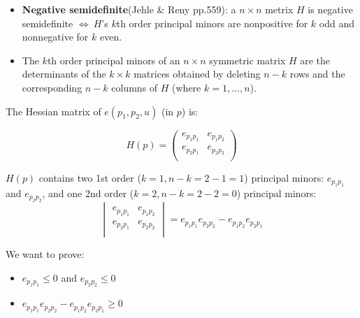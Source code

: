 \documentclass{article}
\begin{document}
\begin{mdframed}[backgroundcolor=blue!20,linecolor=white]
\begin{itemize}
\item \textbf{Negative semidefinite}(Jehle \& Reny pp.559): a $n \times n$ metrix $H$ is negative semidefinite $\iff \ H$'s $k$th order principal minors are nonpositive for $k$ odd and nonnegative for $k$ even.

\item The $k$th order principal minors of an $n \times n$ symmetric matrix $H$ are the determinants of the $k \times k$ matrices obtained by deleting $n − k$ rows and the corresponding $n − k$ columns of $H$ (where $k = 1, ..., n$).

\end{itemize}

\vspace{2mm}

The Hessian matrix of $e(p_1,p_2,u)$ (in $p$) is:

\vspace{2mm}


\begin{equation}
H(p)=\left(
    \begin{array}{cc}
		e_{p_1p_1} & e_{p_1p_2}  \\
		e_{p_2p_1} & e_{p_2p_2}  \\
    \end{array}
    \right) 
\label{eq:hessian_e}   
\end{equation}

\vspace{2mm}

$H(p)$ contains two 1st order ($k = 1, n - k = 2 -1 = 1$) principal minors: $e_{p_1p_1}$ and $e_{p_2p_2}$, and one 2nd order ($k = 2, n - k = 2 -2 = 0$) principal minors:
\begin{equation}
    \begin{vmatrix}
		e_{p_1p_1} & e_{p_1p_2}  \\
		e_{p_2p_1} & e_{p_2p_2}  \\
    \end{vmatrix}
=e_{p_1p_1}e_{p_2p_2} - e_{p_1p_2}e_{p_2p_1}
\label{eq:pminor_e}   
\end{equation}

We want to prove:

\begin{itemize}
\item  $e_{p_1p_1} \le 0$  and $e_{p_2p_2} \le 0$
\item  $e_{p_1p_1}e_{p_2p_2} - e_{p_1p_2}e_{p_2p_1} \ge 0$

\end{itemize}


\end{mdframed}
\end{document}
